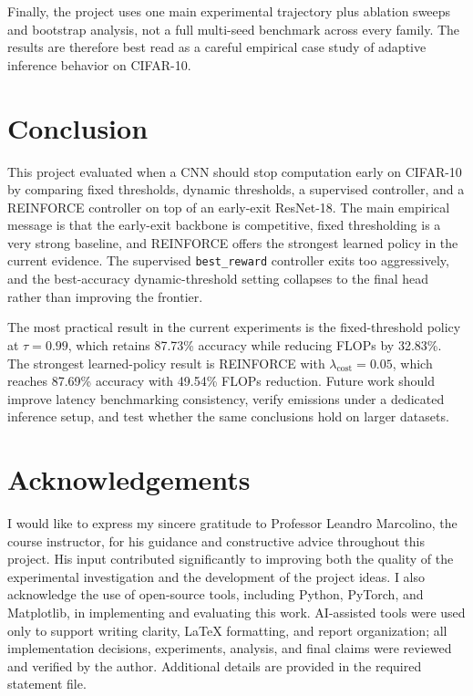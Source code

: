 \documentclass[10pt,twocolumn]{article}
\newcommand{\dataset}{CIFAR-10}
\newcommand{\backbone}{ResNet-18}
\begin{document}
Finally, the project uses one main experimental trajectory plus ablation sweeps and bootstrap analysis, not a full multi-seed benchmark across every family. The results are therefore best read as a careful empirical case study of adaptive inference behavior on \dataset{}.

\section{Conclusion}

This project evaluated when a CNN should stop computation early on \dataset{} by comparing fixed thresholds, dynamic thresholds, a supervised controller, and a REINFORCE controller on top of an early-exit \backbone{}. The main empirical message is that the early-exit backbone is competitive, fixed thresholding is a very strong baseline, and REINFORCE offers the strongest learned policy in the current evidence. The supervised \texttt{best\_reward} controller exits too aggressively, and the best-accuracy dynamic-threshold setting collapses to the final head rather than improving the frontier.

The most practical result in the current experiments is the fixed-threshold policy at $\tau = 0.99$, which retains 87.73\% accuracy while reducing FLOPs by 32.83\%. The strongest learned-policy result is REINFORCE with $\lambda_{\text{cost}} = 0.05$, which reaches 87.69\% accuracy with 49.54\% FLOPs reduction. Future work should improve latency benchmarking consistency, verify emissions under a dedicated inference setup, and test whether the same conclusions hold on larger datasets.

\section*{Acknowledgements}

I would like to express my sincere gratitude to Professor Leandro Marcolino, the course instructor, for his guidance and constructive advice throughout this project. His input contributed significantly to improving both the quality of the experimental investigation and the development of the project ideas. I also acknowledge the use of open-source tools, including Python, PyTorch, and Matplotlib, in implementing and evaluating this work. AI-assisted tools were used only to support writing clarity, LaTeX formatting, and report organization; all implementation decisions, experiments, analysis, and final claims were reviewed and verified by the author. Additional details are provided in the required statement file.
\balance


\end{document}
